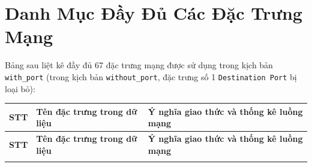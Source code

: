 
\chapter{Danh Mục Đầy Đủ Các Đặc Trưng Mạng}
\label{app:feature_list}

Bảng sau liệt kê đầy đủ 67 đặc trưng mạng được sử dụng trong kịch bản \texttt{with\_port} (trong kịch bản \texttt{without\_port}, đặc trưng số 1 \texttt{Destination Port} bị loại bỏ):

\begin{longtable}{rlp{7.2cm}}
\toprule
\textbf{STT} & \textbf{Tên đặc trưng trong dữ liệu} & \textbf{Ý nghĩa giao thức và thống kê luồng mạng} \\
\midrule
\endfirsthead
\toprule
\textbf{STT} & \textbf{Tên đặc trưng trong dữ liệu} & \textbf{Ý nghĩa giao thức và thống kê luồng mạng} \\
\midrule
\endhead
\bottomrule
\endfoot


\end{longtable}
